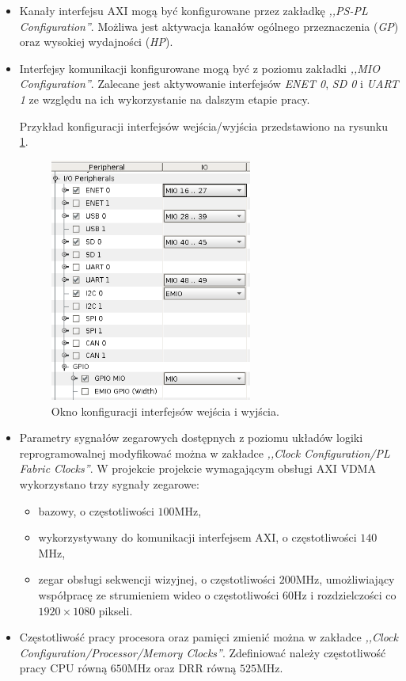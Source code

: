 \begin{itemize}
	\item Kanały interfejsu AXI mogą być konfigurowane przez zakładkę \emph{,,PS-PL Configuration''}. Możliwa jest aktywacja kanałów ogólnego przeznaczenia (\emph{GP}) oraz wysokiej wydajności (\emph{HP}).
	
	\item Interfejsy komunikacji konfigurowane mogą być z poziomu zakładki \emph{,,MIO Configuration''}. Zalecane jest aktywowanie interfejsów \emph{ENET 0}, \emph{SD 0} i \emph{UART 1} ze względu na ich wykorzystanie na dalszym etapie pracy.
	
	Przykład konfiguracji interfejsów wejścia/wyjścia przedstawiono na rysunku \ref{fig:vivado-mio-configuration}.
	\begin{figure}[ht]
		\centering
		\includegraphics[height=8cm]{img/vivado/mio-configuration.png}
		\caption{Okno konfiguracji interfejsów wejścia i wyjścia.}
		\label{fig:vivado-mio-configuration}
	\end{figure}
	
	\item Parametry sygnałów zegarowych dostępnych z poziomu układów logiki reprogramowalnej modyfikować można w zakładce \emph{,,Clock Configuration/PL Fabric Clocks''}. W projekcie projekcie wymagającym obsługi AXI VDMA wykorzystano trzy sygnały zegarowe:
	\begin{itemize}[label=\textbullet]
		\item bazowy, o częstotliwości $100$MHz,
		\item wykorzystywany do komunikacji interfejsem AXI, o częstotliwości $140$MHz,
		\item zegar obsługi sekwencji wizyjnej, o częstotliwości $200$MHz, umożliwiający współpracę ze strumieniem wideo o częstotliwości $60$Hz i rozdzielczości co $1920 \times 1080$ pikseli.
	\end{itemize}
	
	\item Częstotliwość pracy procesora oraz pamięci zmienić można w zakładce \emph{,,Clock Configuration/Processor/Memory Clocks''}. Zdefiniować należy częstotliwość pracy CPU równą $650$MHz oraz DRR równą $525$MHz.
	
\end{itemize}


